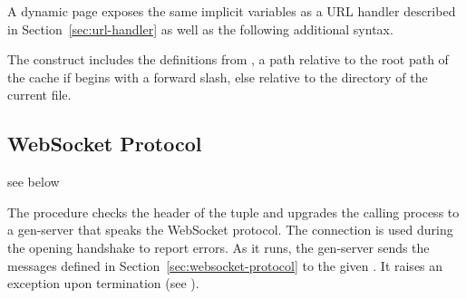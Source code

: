 A dynamic page exposes the same implicit variables as a URL handler
described in Section~\ref{sec:url-handler} as well as the following
additional syntax.

\begin{syntax}
\end{syntax}\antipar
{}

\begin{syntax}
\end{syntax}\antipar
{}

\begin{syntax}
\end{syntax}\antipar

The  construct includes the definitions from
, a path relative to the root path of the cache if
 begins with a forward slash, else relative to the
directory of the current file.


\subsection {WebSocket Protocol}

\begin{procedure}
\end{procedure}
\returns{} see below

The  procedure checks the header of the 
tuple and upgrades the calling process to a gen-server that speaks the
WebSocket protocol. The connection  is used during the
opening handshake to report errors. As it runs, the gen-server sends
the messages defined in Section~\ref{sec:websocket-protocol} to the
given . It raises an exception upon termination (see
).

